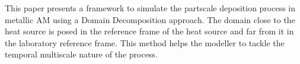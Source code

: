 This paper presents a framework to simulate the partscale deposition
process in metallic AM using a Domain Decomposition approach.
The domain close to the heat source is posed in the reference
frame of the heat source and far from it in the laboratory
reference frame. This method helps the modeller to tackle the
temporal multiscale nature of the process.
